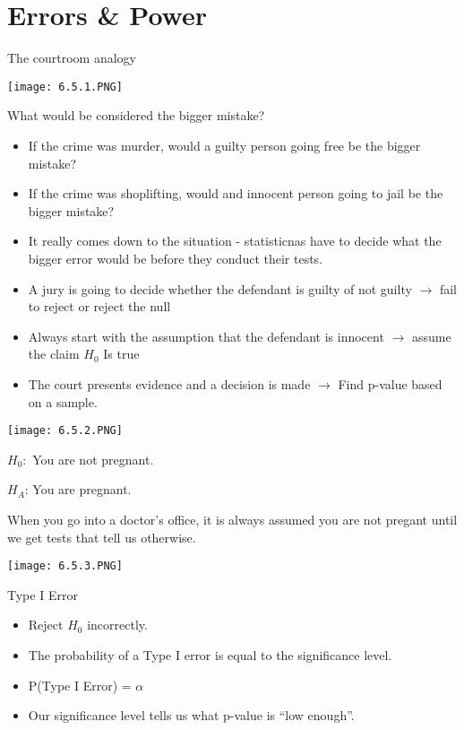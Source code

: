 \documentclass[../stats.tex]{subfiles}
\begin{document}
\section{Errors \& Power}
The courtroom analogy 
\begin{center}
    \texttt{[image: 6.5.1.PNG]}
\end{center}

What would be considered the bigger mistake?
\begin{itemize}
    \item If the crime was murder, would a guilty person going free be the bigger mistake?
    \item If the crime was shoplifting, would and innocent person going to jail be the bigger mistake?
    \item It really comes down to the situation - statisticnas have to decide what the bigger error would be before they conduct their tests.
\end{itemize}

\begin{itemize}
    \item A jury is going to decide whether the defendant is guilty of not guilty $\rightarrow$ fail to reject or reject the null 
    \item Always start with the assumption that the defendant is innocent $\rightarrow$ assume the claim $H_0$ Is true 
    \item The court presents evidence and a decision is made $\rightarrow$ Find p-value based on a sample.
\end{itemize}

\begin{center}
    \texttt{[image: 6.5.2.PNG]}
\end{center}

\pagebreak
\begin{example}
    $H_0:$ You are not pregnant.

    $H_A$: You are pregnant.

    When you go into a doctor's office, it is always assumed you are not pregant until we get tests that tell us otherwise.
    \begin{center}
        \texttt{[image: 6.5.3.PNG]}
    \end{center}
\end{example}

Type I Error 
\begin{itemize}
    \item Reject $H_0$ incorrectly.
    \item The probability of a Type I error is equal to the significance level.
    \item P(Type I Error) = $\alpha$
    \item Our significance level tells us what p-value is ``low enough''.
\end{itemize}
\end{document}
